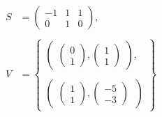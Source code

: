 \begin{align*}
    S &= \begin{pmatrix}
        -1 & 1 & 1 \\
        0 & 1 & 0
    \end{pmatrix}, \ \\ \\
    V &= \begin{Bmatrix}
        \begin{pmatrix}
              \begin{pmatrix}
                    0 \\
                    1
               \end{pmatrix},
               \begin{pmatrix}
                     1 \\
                     1
               \end{pmatrix}
        \end{pmatrix}, \\ \\
        \begin{pmatrix}
               \begin{pmatrix}
                    1 \\
                    1
               \end{pmatrix},
               \begin{pmatrix}
                    -5 \\
                    -3
              \end{pmatrix}
        \ \end{pmatrix}
    \end{Bmatrix}
\end{align*}
